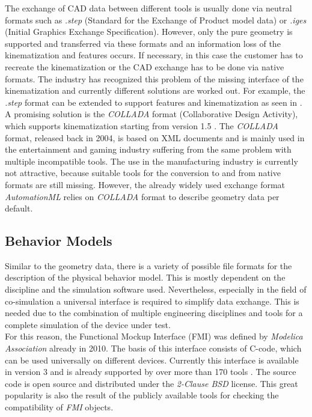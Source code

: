 	The exchange of CAD data between different tools is usually done via neutral formats such as \textit{.step} (Standard for the Exchange of Product model data) or \textit{.iges} (Initial Graphics Exchange Specification). However, only the pure geometry is supported and transferred via these formats and an information loss of the kinematization and features occurs. If necessary, in this case the customer has to recreate the kinematization or the CAD exchange has to be done via native formats. The industry has recognized this problem of the missing interface of the kinematization and currently different solutions are worked out. For example, the \textit{.step} format can be extended to support features and kinematization as seen in \cite{StepWithKin}. \\
	A promising solution is the \textit{COLLADA} format (Collaborative Design Activity), which supports kinematization starting from version 1.5 \cite{ColladaSpecification}. The \textit{COLLADA} format, released back in 2004, is based on XML documents and is mainly used in the entertainment and gaming industry suffering from the same problem with multiple incompatible tools. The use in the manufacturing industry is currently not attractive, because suitable tools for the conversion to and from native formats are still missing. However, the already widely used exchange format \textit{AutomationML} relies on \textit{COLLADA} format to describe geometry data per default. 


\subsection{Behavior Models}	%
	Similar to the geometry data, there is a variety of possible file formats for the description of the physical behavior model. This is mostly dependent on the discipline and the simulation software used. 
	Nevertheless, especially in the field of co-simulation a universal interface is required to simplify data exchange. This is needed due to the combination of multiple engineering disciplines and tools for a complete simulation of the device under test.\\
	
	For this reason, the Functional Mockup Interface (FMI) was defined by \textit{Modelica Association} already in 2010. The basis of this interface consists of C-code, which can be used universally on different devices. Currently this interface is available in version 3 and is already supported by over more than 170 tools \cite{FmiSpecification}. The source code is open source and distributed under the \textit{2-Clause BSD} license. This great popularity is also the result of the publicly available tools for checking the compatibility of \textit{FMI} objects. 

